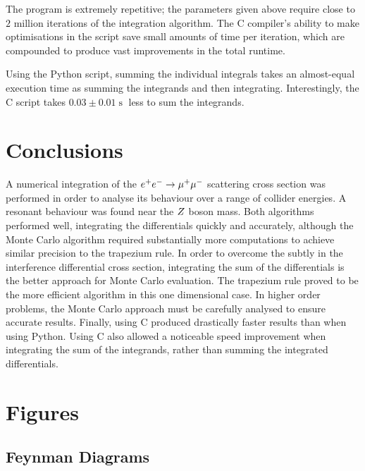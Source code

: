 \documentclass[]{article}
\begin{document}
The program is extremely repetitive; the parameters given above require close to $2$ million iterations of the integration algorithm. The C compiler's ability to make optimisations in the script save small amounts of time per iteration, which are compounded to produce vast improvements in the total runtime.

Using the Python script, summing the individual integrals takes an almost-equal execution time as summing the integrands and then integrating. Interestingly, the C script takes $0.03\pm0.01\operatorname{s}$ less to sum the integrands.

\section{Conclusions}\label{sec:conclusion}

A numerical integration of the $e^+ e^-  \rightarrow \mathrm{\mu^+ \mu^-} $ scattering cross section was performed in order to analyse its behaviour over a range of collider energies. A resonant behaviour was found near the $Z $ boson mass. Both algorithms performed well, integrating the differentials quickly and accurately, although the Monte Carlo algorithm required substantially more computations to achieve similar precision to the trapezium rule. In order to overcome the subtly in the interference differential cross section, integrating the sum of the differentials is the better approach for Monte Carlo evaluation. The trapezium rule proved to be the more efficient algorithm in this one dimensional case. In higher order problems, the Monte Carlo approach must be carefully analysed to ensure accurate results. Finally, using C produced drastically faster results than when using Python. Using C also allowed a noticeable speed improvement when integrating the sum of the integrands, rather than summing the integrated differentials.

\section{Figures}

\subsection{Feynman Diagrams}
\end{document}
